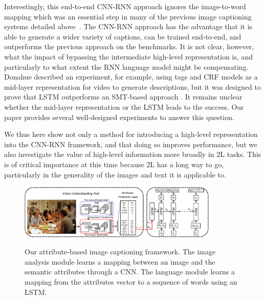 Interestingly, this end-to-end CNN-RNN approach ignores the image-to-word mapping which was an essential step in many of the previous image captioning systems detailed above~\cite{farhadi2010every,kulkarni2013babytalk,li2011composing,yang2011corpus}. The CNN-RNN approach has the advantage that it is able to generate a wider variety of captions, can be trained end-to-end, and outperforms the previous approach on the benchmarks. It is not clear, however, what the impact of bypassing the intermediate high-level representation is, and particularly to what extent the RNN language model might be compensating. Donahue \etal \cite{donahue2014long} described an experiment, for example, using tags and CRF models as a mid-layer representation for video to generate descriptions, but it was designed to prove that LSTM outperforms an SMT-based approach \cite{rohrbach2013translating}. It remains unclear whether the mid-layer representation or the LSTM leads to the success. Our paper provides several well-designed experiments to answer this question.

We thus here show not only a method for introducing a high-level representation into the CNN-RNN framework, and that doing so improves performance, but we also investigate the value of high-level information more broadly in \V2L tasks.  This is of critical importance at this time because \V2L has a long way to go, particularly in the generality of the images and text it is applicable to.

\begin{figure}[t!]
  \centering
  \includegraphics[width=0.85\textwidth]{./img/captioning_frame.pdf}\\
  \vspace{-5pt}
  \caption{Our attribute-based image captioning framework. The image analysis module learns a mapping between an image and the semantic attributes through a CNN. The language module learns a mapping from the attributes vector to a sequence of words using an LSTM. }
  \label{img:cap_frame}
  \vspace{-5pt}
\end{figure}

